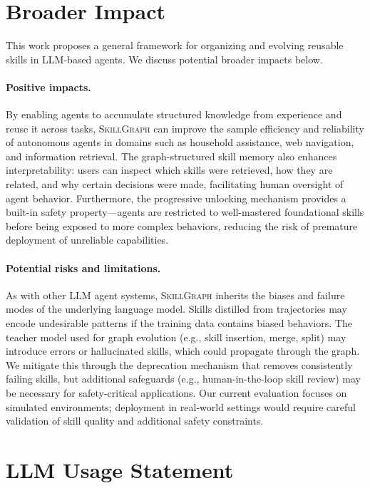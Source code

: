 \section{Broader Impact}
\label{app:broader_impact}

This work proposes a general framework for organizing and evolving reusable skills in LLM-based agents. We discuss potential broader impacts below.

\paragraph{Positive impacts.}
By enabling agents to accumulate structured knowledge from experience and reuse it across tasks, \textsc{SkillGraph} can improve the sample efficiency and reliability of autonomous agents in domains such as household assistance, web navigation, and information retrieval. The graph-structured skill memory also enhances interpretability: users can inspect which skills were retrieved, how they are related, and why certain decisions were made, facilitating human oversight of agent behavior. Furthermore, the progressive unlocking mechanism provides a built-in safety property---agents are restricted to well-mastered foundational skills before being exposed to more complex behaviors, reducing the risk of premature deployment of unreliable capabilities.

\paragraph{Potential risks and limitations.}
As with other LLM agent systems, \textsc{SkillGraph} inherits the biases and failure modes of the underlying language model. Skills distilled from trajectories may encode undesirable patterns if the training data contains biased behaviors. The teacher model used for graph evolution (e.g., skill insertion, merge, split) may introduce errors or hallucinated skills, which could propagate through the graph. We mitigate this through the deprecation mechanism that removes consistently failing skills, but additional safeguards (e.g., human-in-the-loop skill review) may be necessary for safety-critical applications. Our current evaluation focuses on simulated environments; deployment in real-world settings would require careful validation of skill quality and additional safety constraints.

\section{LLM Usage Statement}
\label{app:llm_usage}

